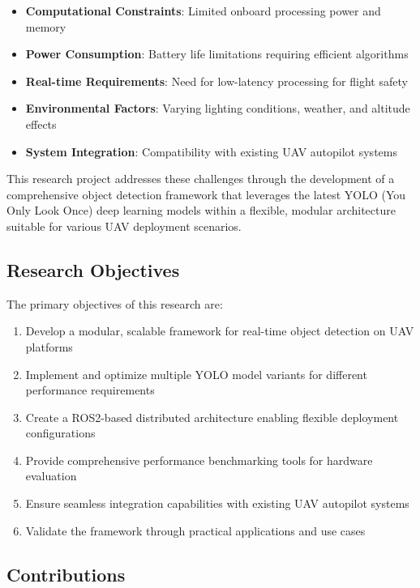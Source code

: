 \documentclass[12pt,a4paper]{article}
\begin{document}
\begin{itemize}[itemsep=0.5em]
    \item \textbf{Computational Constraints}: Limited onboard processing power and memory
    \item \textbf{Power Consumption}: Battery life limitations requiring efficient algorithms
    \item \textbf{Real-time Requirements}: Need for low-latency processing for flight safety
    \item \textbf{Environmental Factors}: Varying lighting conditions, weather, and altitude effects
    \item \textbf{System Integration}: Compatibility with existing UAV autopilot systems
\end{itemize}

This research project addresses these challenges through the development of a comprehensive object detection framework that leverages the latest YOLO (You Only Look Once) deep learning models within a flexible, modular architecture suitable for various UAV deployment scenarios.

\subsection{Research Objectives}

The primary objectives of this research are:

\begin{enumerate}[itemsep=0.5em]
    \item Develop a modular, scalable framework for real-time object detection on UAV platforms
    \item Implement and optimize multiple YOLO model variants for different performance requirements
    \item Create a ROS2-based distributed architecture enabling flexible deployment configurations
    \item Provide comprehensive performance benchmarking tools for hardware evaluation
    \item Ensure seamless integration capabilities with existing UAV autopilot systems
    \item Validate the framework through practical applications and use cases
\end{enumerate}

\subsection{Contributions}
\end{document}
